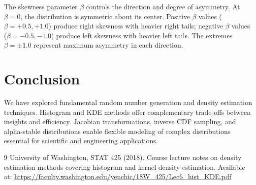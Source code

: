 \documentclass[12pt]{article}
\begin{document}
The skewness parameter $\beta $ controls the direction and degree of asymmetry. At $\beta = 0$, the distribution is symmetric about its center. Positive $\beta$ values ($\beta = +0.5, +1.0$) produce right skewness with heavier right tails; negative $\beta$ values ($\beta = -0.5, -1.0$) produce left skewness with heavier left tails. The extremes $\beta = \pm 1.0$ represent maximum asymmetry in each direction.

\section{Conclusion}

We have explored fundamental random number generation and density estimation techniques. Histogram and KDE methods offer complementary trade-offs between insights and efficiency. Jacobian transformations, inverse CDF sampling, and alpha-stable distributions enable flexible modeling of complex distributions essential for scientific and engineering applications.

\begin{thebibliography}{9}
     University of Washington, STAT 425 (2018). Course lecture notes on density estimation methods covering histogram and kernel density estimation. Available at: \url{https://faculty.washington.edu/yenchic/18W_425/Lec6_hist_KDE.pdf}
\end{thebibliography}
\end{document}
